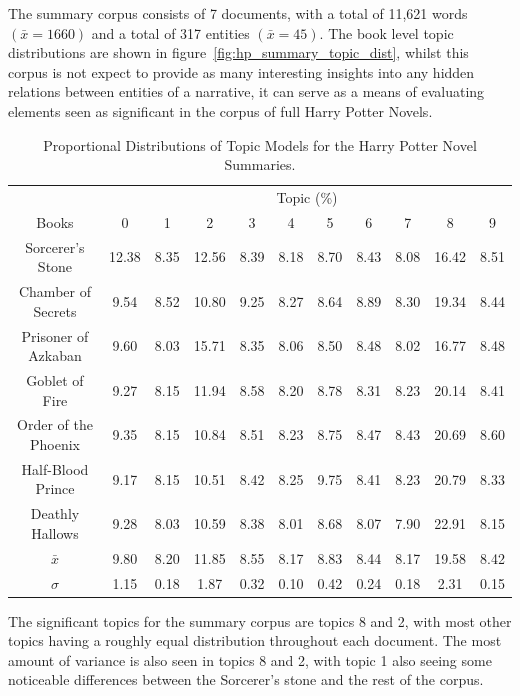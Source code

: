 \documentclass[10pt]{report}
\begin{document}
The summary corpus consists of 7 documents, with a total of 11,621 words $(\bar{x}=1660)$ and a total of 317 entities $(\bar{x}=45)$. The book level topic distributions are shown in figure~\ref{fig:hp_summary_topic_dist}, whilst this corpus is not expect to provide as many interesting insights into any hidden relations between entities of a narrative, it can serve as a means of evaluating elements seen as significant in the corpus of full Harry Potter Novels.

\renewcommand{\baselinestretch}{1.0}\normalsize
\renewcommand{\arraystretch}{1.0}
\begin{table}[h!]
  \begin{tabular}{c || c | c | c | c | c | c | c | c | c | c}
     & \multicolumn{10}{c}{Topic (\%)}\\
    Books&                      0&	    1&	    2&	    3&	    4&	    5&	    6&  	7&	    8&	  9\\
    \hline
    Sorcerer's Stone	    &12.38&	8.35&	12.56&	8.39&	8.18&	8.70&	8.43&	8.08&	16.42&	8.51\\
    Chamber of Secrets	    &9.54&	8.52&	10.80&	9.25&	8.27&	8.64&	8.89&	8.30&	19.34&	8.44\\
    Prisoner of Azkaban	    &9.60&	8.03&	15.71&	8.35&	8.06&	8.50&	8.48&	8.02&	16.77&	8.48\\
    Goblet of Fire	        &9.27&	8.15&	11.94&	8.58&	8.20&	8.78&	8.31&	8.23&	20.14&	8.41\\
    Order of the Phoenix	&9.35&	8.15&	10.84&	8.51&	8.23&	8.75&	8.47&	8.43&	20.69&	8.60\\
    Half-Blood Prince	    &9.17&	8.15&	10.51&	8.42&	8.25&	9.75&	8.41&	8.23&	20.79&	8.33\\
    Deathly Hallows	        &9.28&	8.03&	10.59&	8.38&	8.01&	8.68&	8.07&	7.90&	22.91&	8.15\\
    \hline
    $\bar{x}$	            &9.80&	8.20&	11.85&	8.55&	8.17&	8.83&	8.44&	8.17&	19.58&	8.42\\
    $\sigma$	            &1.15&	0.18&	1.87&	0.32&	0.10&	0.42&	0.24&	0.18&	2.31&	0.15                                                                                         
  \end{tabular}
  \caption{Proportional Distributions of Topic Models for the Harry Potter Novel Summaries.}
\end{table}
\renewcommand{\baselinestretch}{2.0}\normalsize
\renewcommand{\arraystretch}{1.0}
\clearpage
The significant topics for the summary corpus are topics 8 and 2, with most other topics having a roughly equal distribution throughout each document. The most amount of variance is also seen in topics 8 and 2, with topic 1 also seeing some noticeable differences between the Sorcerer's stone and the rest of the corpus.
\end{document}
